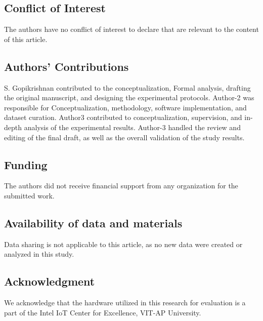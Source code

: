 \documentclass[a4paper,fleqn]{cas-dc}
\numberwithin{equation}{section}
\begin{document}
\subsection*{Conflict of Interest}
The authors have no conflict of interest to declare that are relevant to the content of this article.

\subsection*{Authors' Contributions}
S. Gopikrishnan contributed to the conceptualization, Formal analysis, drafting the original manuscript, and designing the experimental protocols. Author-2 was responsible for Conceptualization, methodology, software implementation, and dataset curation. Author3 contributed to conceptualization, supervision, and in-depth analysis of the experimental results. Author-3 handled the review and editing of the final draft, as well as the overall validation of the study results.


\subsection*{Funding}
The authors did not receive financial support from any organization for the submitted work.

\subsection*{Availability of data and materials}
Data sharing is not applicable to this article, as no new data were created or analyzed in this study.

\subsection*{Acknowledgment}
We acknowledge that the hardware utilized in this research for evaluation is a part of the Intel IoT Center for Excellence, VIT-AP University. 



\end{document}
